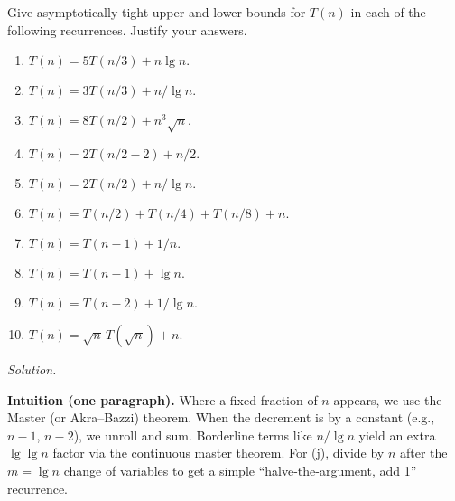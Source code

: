 \documentclass[12pt]{article}
\theoremstyle{definition}
\begin{document}
\medskip
Give asymptotically tight upper and lower bounds for $T(n)$ in each of the following recurrences. Justify your answers.
\begin{enumerate}
\item $T(n)=5T(n/3)+n\lg n.$
\item $T(n)=3T(n/3)+n/\lg n.$
\item $T(n)=8T(n/2)+n^{3}\sqrt{n}.$
\item $T(n)=2T(n/2-2)+n/2.$
\item $T(n)=2T(n/2)+n/\lg n.$
\item $T(n)=T(n/2)+T(n/4)+T(n/8)+n.$
\item $T(n)=T(n-1)+1/n.$
\item $T(n)=T(n-1)+\lg n.$
\item $T(n)=T(n-2)+1/\lg n.$
\item $T(n)=\sqrt{n}\,T(\sqrt{n})+n.$
\end{enumerate}

\medskip
\noindent\textit{Solution.}

\medskip
\noindent\textbf{Intuition (one paragraph).}
Where a fixed fraction of $n$ appears, we use the Master (or Akra–Bazzi) theorem.  
When the decrement is by a constant (e.g., $n-1$, $n-2$), we unroll and sum.  
Borderline terms like $n/\lg n$ yield an extra $\lg\lg n$ factor via the continuous master theorem.  
For (j), divide by $n$ after the $m=\lg n$ change of variables to get a simple “halve-the-argument, add 1” recurrence.
\end{document}
